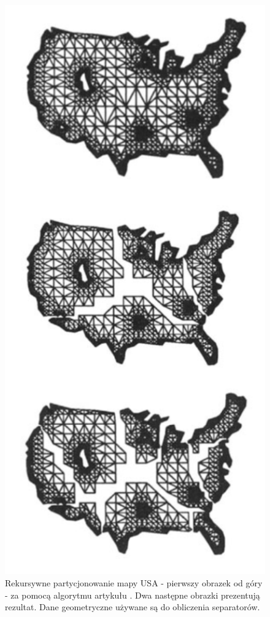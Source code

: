 \begin{figure}
    \includegraphics[width=\linewidth]{images/recursive-partitioning}
    \caption{Rekursywne partycjonowanie mapy USA - pierwszy obrazek od góry - za pomocą algorytmu artykułu \cite{MiTeThVa93}.
    Dwa następne obrazki prezentują rezultat. Dane geometryczne używane są do obliczenia separatorów.}
\end{figure}



